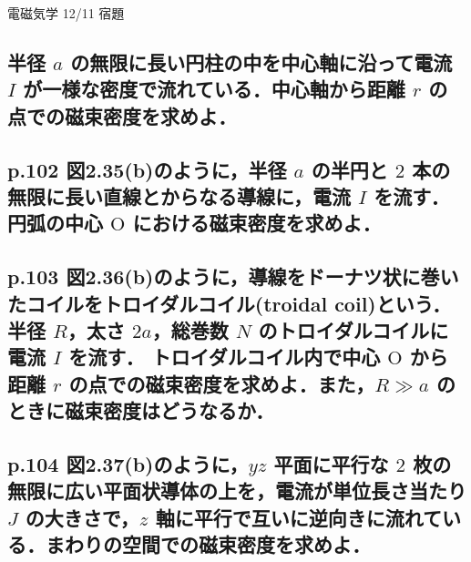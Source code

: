 \documentclass[a4paper, 12pt]{bxjsarticle}
\begin{document}
\begin{center}
    \begin{huge}
        電磁気学 12/11 宿題
    \end{huge}
\end{center}

\subsection{半径 \(a\) の無限に長い円柱の中を中心軸に沿って電流 \(I\) が一様な密度で流れている．中心軸から距離 \(r\) の点での磁束密度を求めよ．}
\vspace{20em}
\subsection{p.102 図2.35(b)のように，半径 \(a\) の半円と \(2\) 本の無限に長い直線とからなる導線に，電流 \(I\) を流す．円弧の中心 \(\mathrm{O}\) における磁束密度を求めよ．}
\newpage
\subsection{p.103 図2.36(b)のように，導線をドーナツ状に巻いたコイルをトロイダルコイル(troidal coil)という．半径 \(R\)，太さ \(2a\)，総巻数 \(N\) のトロイダルコイルに電流 \(I\) を流す．%
トロイダルコイル内で中心 \(\mathrm{O}\) から距離 \(r\) の点での磁束密度を求めよ．また，\(R \gg a\) のときに磁束密度はどうなるか．}
\vspace{20em}
\subsection{p.104 図2.37(b)のように，\(yz\) 平面に平行な \(2\) 枚の無限に広い平面状導体の上を，電流が単位長さ当たり \(J\) の大きさで，\(z\) 軸に平行で互いに逆向きに流れている．まわりの空間での磁束密度を求めよ．}
\end{document}
